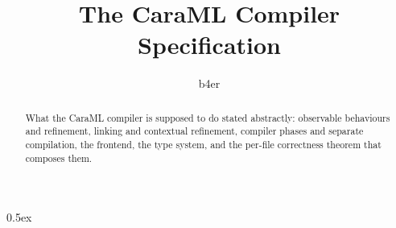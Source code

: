 \documentclass[11pt,a4paper]{article}
\begin{document}
\title{The CaraML Compiler Specification}
\author{b4er}
\maketitle

\begin{abstract}
  What the CaraML compiler is supposed to do stated abstractly: observable
  behaviours and refinement, linking and contextual refinement, compiler
  phases and separate compilation, the frontend, the type system, and the
  per-file correctness theorem that composes them.
\end{abstract}

\tableofcontents

\parindent 0pt\parskip 0.5ex





\end{document}
